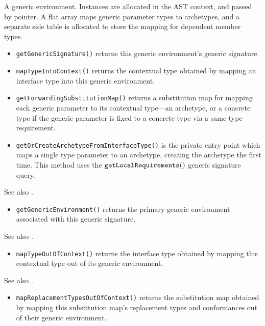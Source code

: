 \documentclass[../generics]{subfiles}
\begin{document}
A generic environment. Instances are allocated in the AST context, and passed by pointer. A flat array maps generic parameter types to archetypes, and a separate side table is allocated to store the mapping for dependent member types.
\begin{itemize}
\item \texttt{getGenericSignature()} returns this generic environment's generic signature.
\item \texttt{mapTypeIntoContext()} returns the contextual type obtained by mapping an interface type into this generic environment.
\item \texttt{getForwardingSubstitutionMap()} returns a substitution map for mapping each generic parameter to its contextual type---an archetype, or a concrete type if the generic parameter is fixed to a concrete type via a same-type requirement.

\item \texttt{getOrCreateArchetypeFromInterfaceType()} is the private entry point which maps a single type parameter to an archetype, creating the archetype the first time. This method uses the $\texttt{getLocalRequirements}()$ generic signature query.
\end{itemize}

See also .
\begin{itemize}
\item \texttt{getGenericEnvironment()} returns the primary generic environment associated with this generic signature.
\end{itemize}

See also .
\begin{itemize}
\item \texttt{mapTypeOutOfContext()} returns the interface type obtained by mapping this contextual type out of its generic environment.
\end{itemize}

See also .
\begin{itemize}
\item \texttt{mapReplacementTypesOutOfContext()} returns the substitution map obtained by mapping this substitution map's replacement types and conformances out of their generic environment.
\end{itemize}
\end{document}
